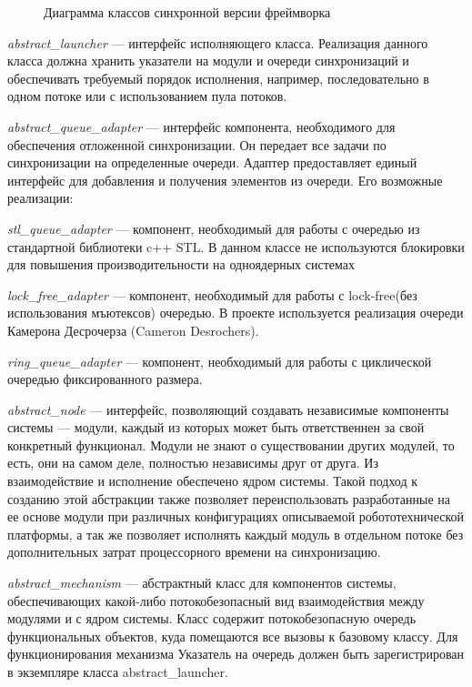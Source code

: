 \begin{figure}[h]
    \caption{Диаграмма классов синхронной версии фреймворка}
    \label{im:2_2_1_sync}
\end{figure}

\textit{abstract\_launcher} --- интерфейс исполняющего класса. Реализация данного класса должна хранить указатели на модули и очереди синхронизаций и обеспечивать требуемый порядок исполнения, например, последовательно в одном потоке или с использованием пула потоков.

\textit{abstract\_queue\_adapter} --- интерфейс компонента, необходимого для обеспечения отложенной синхронизации. Он передает все задачи по синхронизации на определенные очереди. Адаптер предоставляет единый интерфейс для добавления и получения элементов из очереди. Его возможные реализации:

\textit{stl\_queue\_adapter} --- компонент, необходимый для работы с очередью из стандартной библиотеки c++ STL. В данном классе не используются блокировки для повышения производительности на одноядерных системах

\textit{lock\_free\_adapter} --- компонент, необходимый для работы с lock-free(без использования мъютексов) очередью. В проекте используется реализация очереди Камерона Десрочерза (Cameron Desrochers).

\textit{ring\_queue\_adapter} --- компонент, необходимый для работы с  циклической очередью фиксированного размера.

\textit{abstract\_node} --- интерфейс, позволяющий создавать независимые компоненты системы --- модули, каждый из которых может быть ответственнен за свой конкретный функционал. Модули не знают о существовании других модулей, то есть, они на самом деле, полностью независимы друг от друга. Из взаимодействие и исполнение обеспечено ядром системы. Такой подход к созданию этой абстракции также позволяет переиспользовать разработанные на ее основе модули при различных конфигурациях описываемой робототехнической платформы, а так же позволяет исполнять каждый модуль в отдельном потоке без дополнительных затрат процессорного времени на синхронизацию. 

\textit{abstract\_mechanism} --- абстрактный класс для компонентов системы, обеспечивающих какой-либо потокобезопасный вид взаимодействия между модулями и с ядром системы. Класс содержит потокобезопасную очередь функциональных объектов, куда помещаются все вызовы к базовому классу. Для функционирования механизма Указатель на очередь должен быть зарегистрирован в экземпляре класса abstract\_launcher.

